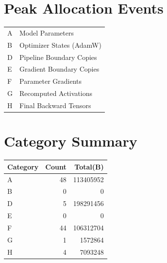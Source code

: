 \documentclass{article}
\begin{document}
\section*{Peak Allocation Events}
\small
\begin{tabular}{ll}
A & Model Parameters \\
B & Optimizer States (AdamW) \\
D & Pipeline Boundary Copies \\
E & Gradient Boundary Copies \\
F & Parameter Gradients \\
G & Recomputed Activations \\
H & Final Backward Tensors \\
\end{tabular}
\vspace{0.5em}
\section*{Category Summary}
\begin{tabular}{l r r}
Category & Count & Total(B) \\
\hline
A & 48 & 113405952 \\
B & 0 & 0 \\
D & 5 & 198291456 \\
E & 0 & 0 \\
F & 44 & 106312704 \\
G & 1 & 1572864 \\
H & 4 & 7093248 \\
\end{tabular}
\vspace{0.5em}
\end{document}
